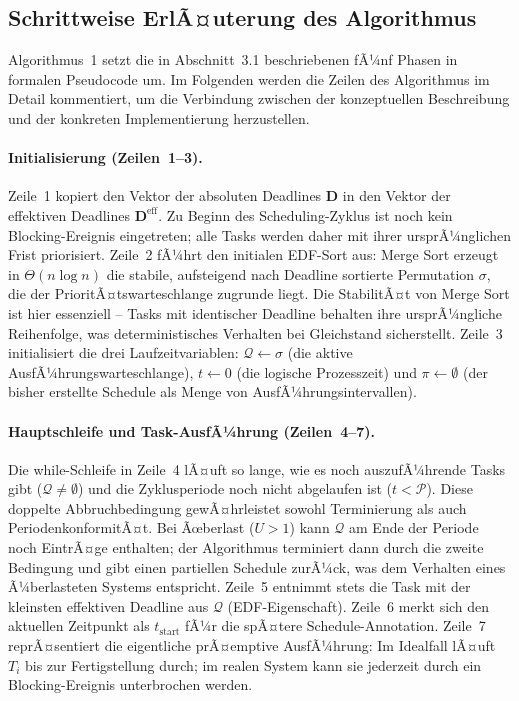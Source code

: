 ﻿\documentclass[a4paper,12pt]{article}
\theoremstyle{definition}
\begin{document}
	\subsection{Schrittweise ErlÃ¤uterung des Algorithmus}
	
	Algorithmus~1 setzt die in Abschnitt~3.1 beschriebenen fÃ¼nf Phasen in formalen Pseudocode um.
	Im Folgenden werden die Zeilen des Algorithmus im Detail kommentiert, um die Verbindung
	zwischen der konzeptuellen Beschreibung und der konkreten Implementierung herzustellen.
	
	\paragraph{Initialisierung (Zeilen~1--3).}
	Zeile~1 kopiert den Vektor der absoluten Deadlines $\mathbf{D}$ in den Vektor der effektiven
	Deadlines $\mathbf{D}^{\text{eff}}$. Zu Beginn des Scheduling-Zyklus ist noch kein
	Blocking-Ereignis eingetreten; alle Tasks werden daher mit ihrer ursprÃ¼nglichen Frist
	priorisiert. Zeile~2 fÃ¼hrt den initialen EDF-Sort aus: Merge Sort erzeugt in $\Theta(n \log n)$
	die stabile, aufsteigend nach Deadline sortierte Permutation $\sigma$, die der
	PrioritÃ¤tswarteschlange zugrunde liegt. Die StabilitÃ¤t von Merge Sort ist hier
	essenziell -- Tasks mit identischer Deadline behalten ihre ursprÃ¼ngliche Reihenfolge,
	was deterministisches Verhalten bei Gleichstand sicherstellt.
	Zeile~3 initialisiert die drei Laufzeitvariablen: $\mathcal{Q} \leftarrow \sigma$ (die
	aktive AusfÃ¼hrungswarteschlange), $t \leftarrow 0$ (die logische Prozesszeit) und
	$\pi \leftarrow \emptyset$ (der bisher erstellte Schedule als Menge von AusfÃ¼hrungsintervallen).
	
	\paragraph{Hauptschleife und Task-AusfÃ¼hrung (Zeilen~4--7).}
	Die while-Schleife in Zeile~4 lÃ¤uft so lange, wie es noch auszufÃ¼hrende Tasks gibt
	($\mathcal{Q} \neq \emptyset$) und die Zyklusperiode noch nicht abgelaufen ist
	($t < \mathcal{P}$). Diese doppelte Abbruchbedingung gewÃ¤hrleistet sowohl Terminierung
	als auch PeriodenkonformitÃ¤t. Bei Ãœberlast ($U > 1$) kann $\mathcal{Q}$ am Ende der
	Periode noch EintrÃ¤ge enthalten; der Algorithmus terminiert dann durch die zweite
	Bedingung und gibt einen partiellen Schedule zurÃ¼ck, was dem Verhalten eines
	Ã¼berlasteten Systems entspricht.
	Zeile~5 entnimmt stets die Task mit der kleinsten effektiven Deadline aus $\mathcal{Q}$
	(EDF-Eigenschaft). Zeile~6 merkt sich den aktuellen Zeitpunkt als $t_{\text{start}}$
	fÃ¼r die spÃ¤tere Schedule-Annotation. Zeile~7 reprÃ¤sentiert die eigentliche
	prÃ¤emptive AusfÃ¼hrung: Im Idealfall lÃ¤uft $T_i$ bis zur Fertigstellung durch;
	im realen System kann sie jederzeit durch ein Blocking-Ereignis unterbrochen werden.
	
\end{document}

